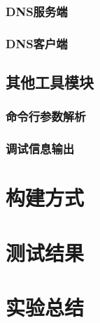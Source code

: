 \documentclass[lang=cn,11pt,a4paper,cite=authornum]{paper}
\begin{document}
\subsubsection{DNS服务端}

\subsubsection{DNS客户端}

\subsection{其他工具模块}

\subsubsection{命令行参数解析}

\subsubsection{调试信息输出}

\section{构建方式}

\section{测试结果}

\section{实验总结}


    
    
\end{document}
